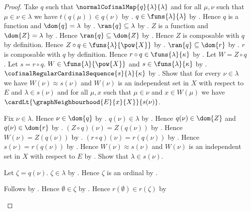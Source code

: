 \begin{proof}
    Take $q$ such that $\normalCofinalMap{q}{\lambda}{\lambda}$ and
        for all $\mu,\nu$ such that $\mu\in\nu\in\lambda$ we have
            $t(q(\mu))\in q(\nu)$ by
        .
    $q\in\funs{\lambda}{\lambda}$ by
        .
    Hence $q$ is a function and $\dom{q}=\lambda$ by
        .
    $\ran{q}\subseteq\lambda$ by .
    $Z$ is a function and $\dom{Z}=\lambda$ by
        .
    Hence $\ran{q}\subseteq\dom{Z}$ by \auto.
    Hence $Z$ is composable with $q$ by definition.
    Hence $Z\circ q\in\funs{\lambda}{\pow{X}}$ by .
    $\ran{q}\subseteq\dom{r}$ by \auto.
    $r$ is composable with $q$ by definition.
    Hence $r\circ q\in\funs{\lambda}{\kappa}$ by .
    Let $W=Z\circ q$.
    Let $s=r\circ q$.
    $W\in\funs{\lambda}{\pow{X}}$ and
        $s\in\funs{\lambda}{\kappa}$ by \auto.
    $\cofinalRegularCardinalSequence{s}{\lambda}{\kappa}$ by
        .
    Show that for every $\nu\in\lambda$ we have
        $W(\nu)\approx s(\nu)$ and
        $W(\nu)$ is an independent set in $X$ with respect to $E$ and
        $\lambda\in s(\nu)$ and
        for all $\mu,x$ such that $\mu\in\nu$ and $x\in W(\mu)$ we have
            $\cardLt{\graphNeighbourhood{E}{x}{X}}{s(\nu)}$.
    \begin{subproof}
        Fix $\nu\in\lambda$.
        Hence $\nu\in\dom{q}$ by \auto.
        $q(\nu)\in\lambda$ by .
        Hence $q(\nu)\in\dom{Z}$ and $q(\nu)\in\dom{r}$ by
            \auto.
        $(Z\circ q)(\nu)=Z(q(\nu))$ by .
        Hence $W(\nu)=Z(q(\nu))$ by \auto.
        $(r\circ q)(\nu)=r(q(\nu))$ by .
        Hence $s(\nu)=r(q(\nu))$ by \auto.
        Hence $W(\nu)\approx s(\nu)$ and
            $W(\nu)$ is an independent set in $X$ with respect to $E$ by
            \auto.
        Show that $\lambda\in s(\nu)$.
        \begin{subproof}
            Let $\zeta=q(\nu)$.
            $\zeta\in\lambda$ by \auto.
            Hence $\zeta$ is an ordinal by
                .
            \begin{byCase}
                    Follows by \auto.
                    Hence $\emptyset\in\zeta$ by
                        .
                    Hence $r(\emptyset)\in r(\zeta)$ by

\end{byCase}
\end{subproof}
\end{subproof}
\end{proof}
